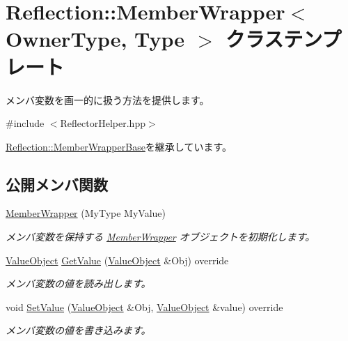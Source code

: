 \hypertarget{class_reflection_1_1_member_wrapper}{}\section{Reflection\+:\+:Member\+Wrapper$<$ Owner\+Type, Type $>$ クラステンプレート}
\label{class_reflection_1_1_member_wrapper}


メンバ変数を画一的に扱う方法を提供します。 




{\ttfamily \#include $<$Reflector\+Helper.\+hpp$>$}



\hyperlink{class_reflection_1_1_member_wrapper_base}{Reflection\+::\+Member\+Wrapper\+Base}を継承しています。

\subsection*{公開メンバ関数}
\begin{DoxyCompactItemize}
\item 
\hyperlink{class_reflection_1_1_member_wrapper_a77482380969cea565f7009333757bf92}{Member\+Wrapper} (My\+Type My\+Value)
\begin{DoxyCompactList}\small\item\em メンバ変数を保持する \hyperlink{class_reflection_1_1_member_wrapper}{Member\+Wrapper} オブジェクトを初期化します。\end{DoxyCompactList}\item 
\hyperlink{class_reflection_1_1_value_object}{Value\+Object} \hyperlink{class_reflection_1_1_member_wrapper_aba0729eea513a25217d70d4155a650f7}{Get\+Value} (\hyperlink{class_reflection_1_1_value_object}{Value\+Object} \&Obj) override
\begin{DoxyCompactList}\small\item\em メンバ変数の値を読み出します。\end{DoxyCompactList}\item 
void \hyperlink{class_reflection_1_1_member_wrapper_a3cfbc4a9a4e9b3ffa6052c40e55d2bae}{Set\+Value} (\hyperlink{class_reflection_1_1_value_object}{Value\+Object} \&Obj, \hyperlink{class_reflection_1_1_value_object}{Value\+Object} \&value) override
\begin{DoxyCompactList}\small\item\em メンバ変数の値を書き込みます。\end{DoxyCompactList}\end{DoxyCompactItemize}


